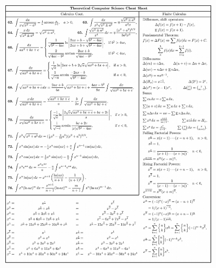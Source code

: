 \documentclass[8pt, a4paper, onesided]{article}
\begin{document}
\begin{landscape}
\begin{figure}[]
    \includegraphics[width=\textheight/3, height=\textwidth - 4.25cm, angle=90]{form1}\\
\end{figure}
\begin{figure}[]
    \centering
    \\

\end{figure}
\end{landscape}
\end{document}
